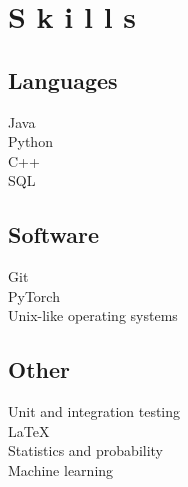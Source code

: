\documentclass[]{deedy-resume-openfont}
\begin{document}
\begin{minipage}[t]{0.33\textwidth}

\section{S k i l l s}

\subsection{Languages}
\textbullet{} Java \\
\textbullet{} Python \\
\textbullet{} C++ \\
\textbullet{} SQL \\

\subsection{Software}
\textbullet{} Git \\
\textbullet{} PyTorch \\
\textbullet{} Unix-like operating systems \\

\subsection{Other}
\textbullet{} Unit and integration testing \\
\textbullet{} \LaTeX\ \\ 
\textbullet{} Statistics and probability \\
\textbullet{} Machine learning
\sectionsep

%
%

\end{minipage} 
\hfill
\end{document}
